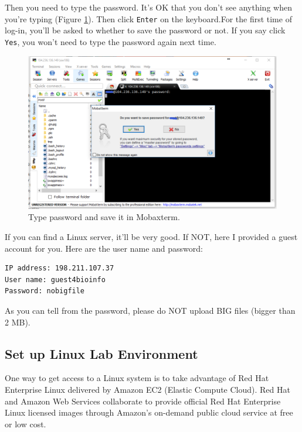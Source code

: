 \documentclass[]{book}
\theoremstyle{definition}
\theoremstyle{definition}
\theoremstyle{definition}
\theoremstyle{remark}
\begin{document}
Then you need to type the password. It's OK that you don't see anything
when you're typing (Figure \ref{fig:mobaxtermSavepswd}). Then click
\texttt{Enter} on the keyboard.For the first time of log-in, you'll be
asked to whether to save the password or not. If you say click
\texttt{Yes}, you won't need to type the password again next time.



\begin{figure}
\centering
\includegraphics{figures/mobaxterm_savepassword.png}
\caption{\label{fig:mobaxtermSavepswd}Type password and save it in Mobaxterm.}
\end{figure}

If you can find a Linux server, it'll be very good. If NOT, here I
provided a guest account for you. Here are the user name and password:

\begin{verbatim}
IP address: 198.211.107.37
User name: guest4bioinfo
Password: nobigfile
\end{verbatim}

As you can tell from the password, please do NOT upload BIG files
(bigger than 2 MB).

\subsection{Set up Linux Lab
Environment}\label{set-up-linux-lab-environment}

One way to get access to a Linux system is to take advantage of Red Hat
Enterprise Linux delivered by Amazon EC2 (Elastic Compute Cloud). Red
Hat and Amazon Web Services collaborate to provide official Red Hat
Enterprise Linux licensed images through Amazon's on-demand public cloud
service at free or low cost.
\end{document}
